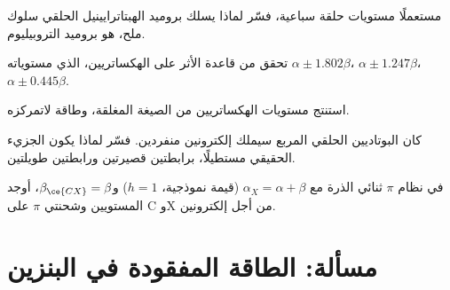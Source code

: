 \begin{exercise}[$\star\star$]\label{exo:b2:huckel:8}
مستعملًا مستويات حلقة سباعية، فسّر لماذا يسلك بروميد الهبتاترايينيل الحلقي
سلوك ملح، هو بروميد التروبيليوم.
\end{exercise}

\begin{exercise}[$\star\star$]\label{exo:b2:huckel:9}
تحقق من قاعدة الأثر على الهكساتريين، الذي مستوياته $\alpha \pm 1.802\beta$، $\alpha \pm
1.247\beta$، $\alpha \pm 0.445\beta$.
\end{exercise}

\begin{exercise}[$\star\star\star$]\label{exo:b2:huckel:10}
استنتج مستويات الهكساتريين من الصيغة المغلقة، وطاقة لاتمركزه.
\end{exercise}

\begin{exercise}[$\star\star\star$]\label{exo:b2:huckel:11}
كان البوتاديين الحلقي المربع سيملك إلكترونين منفردين. فسّر لماذا يكون الجزيء الحقيقي
مستطيلًا، برابطتين قصيرتين ورابطتين طويلتين.
\end{exercise}

\begin{exercise}[$\star\star\star$]\label{exo:b2:huckel:12}
في نظام $\pi$ ثنائي الذرة  مع $\alpha_X = \alpha + \beta$ (قيمة نموذجية، $h = 1$) 
و$\beta_{\ce{CX}} = \beta$، أوجد المستويين وشحنتي $\pi$ على C وX من أجل
إلكترونين.
\end{exercise}

\section{مسألة: الطاقة المفقودة في البنزين}

